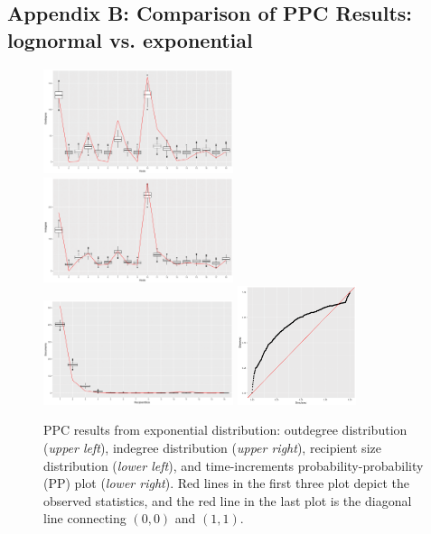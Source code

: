 \documentclass[ba]{imsart}
\numberwithin{equation}{section}
\theoremstyle{plain}
\begin{document}
	\subsection*{Appendix B: Comparison of PPC Results: lognormal vs. exponential}\label{subsec: PPCexp}
	\iffalse
	\begin{figure}[H]
		\centering
		\includegraphics[width=0.495\textwidth]{img/outdegree_exp-1.png}	
		\includegraphics[width=0.495\textwidth]{img/indegree_exp-1.png}	
		\includegraphics[width=0.495\textwidth]{img/recipientsize_exp-1.png}	
		\includegraphics[width=0.31\textwidth]{img/timedist_exp-1.png}
		\caption {PPC results from exponential distribution: outdegree distribution (\textit{upper left}), indegree distribution (\textit{upper right}), recipient size distribution (\textit{lower left}), and time-increments probability-probability (PP) plot  (\textit{lower right}). Red lines in the first three plot depict the observed statistics, and the red line in the last plot is the diagonal line connecting $(0, 0)$ and $(1, 1)$.}
		\label{figure:PPCexp}
	\end{figure}
\end{document}
